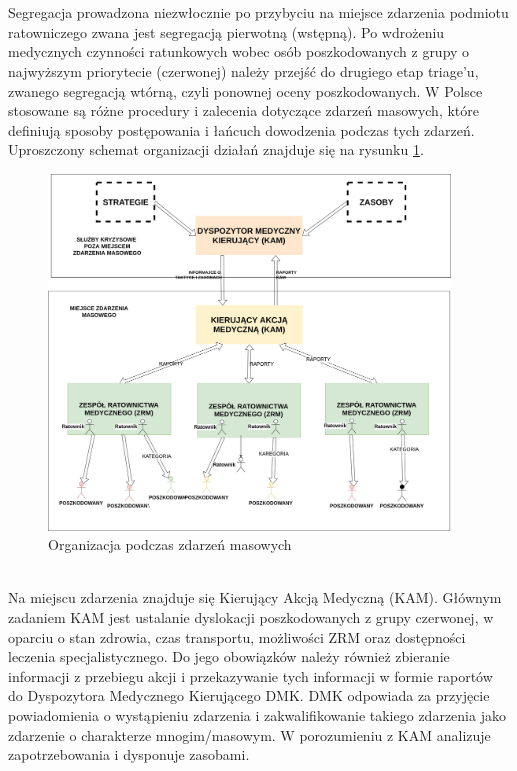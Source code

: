 \documentclass[11pt]{report}
\begin{document}
\\\\
Segregacja prowadzona niezwłocznie po przybyciu na miejsce zdarzenia podmiotu ratowniczego zwana jest segregacją pierwotną (wstępną). Po wdrożeniu medycznych czynności ratunkowych wobec osób poszkodowanych z grupy o najwyższym priorytecie (czerwonej) należy przejść do drugiego etap triage’u, zwanego segregacją wtórną, czyli ponownej oceny poszkodowanych.
\newpage
\noindent
W Polsce stosowane są różne procedury i zalecenia dotyczące zdarzeń masowych, które definiują sposoby postępowania i łańcuch dowodzenia podczas tych zdarzeń. Uproszczony schemat organizacji działań znajduje się na rysunku \ref{fig:org}.
\begin{figure}[h!]
  \centering
    \includegraphics[width=0.95\textwidth]{img/hierarchy.png}
  \caption{Organizacja podczas zdarzeń masowych}
  \label{fig:org}
\end{figure}
\\
Na miejscu zdarzenia znajduje się Kierujący Akcją Medyczną (KAM). Głównym zadaniem KAM jest ustalanie dyslokacji poszkodowanych z grupy czerwonej, w oparciu o stan zdrowia, czas transportu, możliwości ZRM oraz dostępności leczenia specjalistycznego. Do jego obowiązków należy również zbieranie informacji z przebiegu akcji i przekazywanie tych informacji w formie raportów do Dyspozytora Medycznego Kierującego DMK. DMK odpowiada za przyjęcie powiadomienia o wystąpieniu zdarzenia i zakwalifikowanie takiego zdarzenia jako zdarzenie o charakterze mnogim/masowym. W porozumieniu z KAM analizuje zapotrzebowania i dysponuje zasobami.
\newpage
\end{document}
